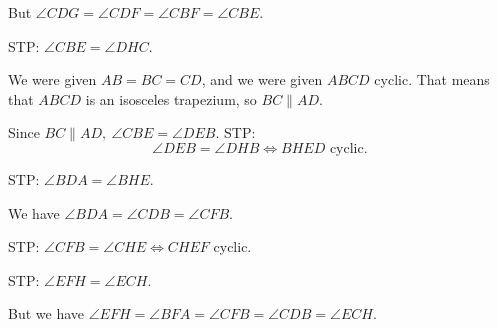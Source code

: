 \documentclass{article}
\begin{document}
\begin{enumerate}[label=G\arabic*.]
    But $\angle CDG=\angle CDF=\angle CBF=\angle CBE$.

    STP\@: $\angle CBE=\angle DHC$.

    We were given $AB=BC=CD$, and we were given $ABCD$ cyclic. That means that
    $ABCD$ is an isosceles trapezium, so $BC\|AD$.

    Since $BC\|AD,\ \angle CBE=\angle DEB$. STP\@: \[\angle DEB=\angle DHB\iff
      BHED \text{ cyclic}.\]

    STP\@: $\angle BDA=\angle BHE$.

    We have $\angle BDA=\angle CDB=\angle CFB$.

    STP\@: $\angle CFB=\angle CHE\iff CHEF$ cyclic.

    STP\@: $\angle EFH=\angle ECH$.
    
    But we have $\angle EFH=\angle BFA=\angle CFB=\angle CDB=\angle ECH$.
\end{enumerate}
\end{document}
